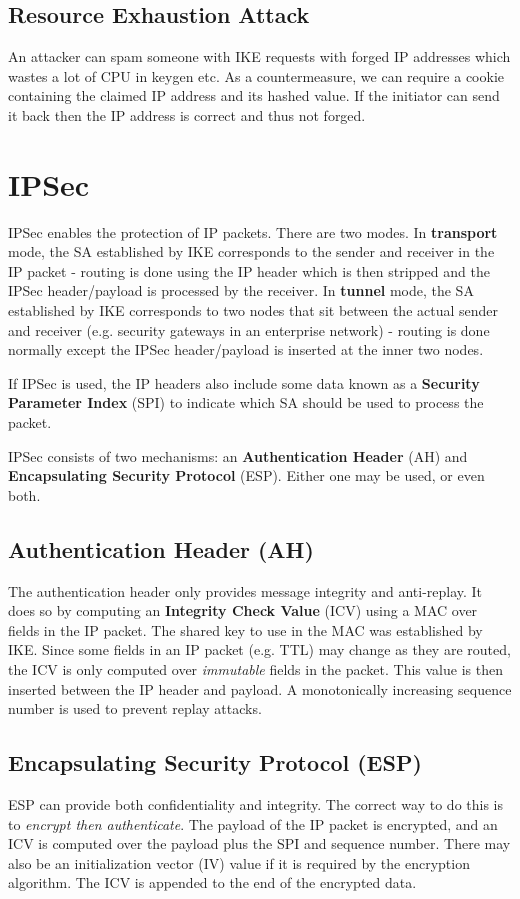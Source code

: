 \documentclass[11pt]{report}
\begin{document}
\subsection{Resource Exhaustion Attack}
An attacker can spam someone with IKE requests with forged IP addresses which wastes a lot of CPU in keygen etc. As a countermeasure, we can require a cookie containing the claimed IP address and its hashed value. If the initiator can send it back then the IP address is correct and thus not forged.

\section{IPSec}
IPSec enables the protection of IP packets. There are two modes. In \textbf{transport} mode, the SA established by IKE corresponds to the sender and receiver in the IP packet - routing is done using the IP header which is then stripped and the IPSec header/payload is processed by the receiver. In \textbf{tunnel} mode, the SA established by IKE corresponds to two nodes that sit between the actual sender and receiver (e.g. security gateways in an enterprise network) - routing is done normally except the IPSec header/payload is inserted at the inner two nodes.

If IPSec is used, the IP headers also include some data known as a \textbf{Security Parameter Index} (SPI) to indicate which SA should be used to process the packet.

IPSec consists of two mechanisms: an \textbf{Authentication Header} (AH) and \textbf{Encapsulating Security Protocol} (ESP). Either one may be used, or even both.

\subsection{Authentication Header (AH)}
The authentication header only provides message integrity and anti-replay. It does so by computing an \textbf{Integrity Check Value} (ICV) using a MAC over fields in the IP packet. The shared key to use in the MAC was established by IKE. Since some fields in an IP packet (e.g. TTL) may change as they are routed, the ICV is only computed over \textit{immutable} fields in the packet. This value is then inserted between the IP header and payload. A monotonically increasing sequence number is used to prevent replay attacks.

\subsection{Encapsulating Security Protocol (ESP)}
ESP can provide both confidentiality and integrity. The correct way to do this is to \textit{encrypt then authenticate}. The payload of the IP packet is encrypted, and an ICV is computed over the payload plus the SPI and sequence number. There may also be an initialization vector (IV) value if it is required by the encryption algorithm. The ICV is appended to the end of the encrypted data.
\end{document}
